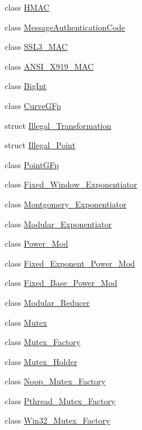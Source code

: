 \begin{DoxyCompactItemize}
class \hyperlink{classBotan_1_1HMAC}{H\-M\-A\-C}
\item 
class \hyperlink{classBotan_1_1MessageAuthenticationCode}{Message\-Authentication\-Code}
\item 
class \hyperlink{classBotan_1_1SSL3__MAC}{S\-S\-L3\-\_\-\-M\-A\-C}
\item 
class \hyperlink{classBotan_1_1ANSI__X919__MAC}{A\-N\-S\-I\-\_\-\-X919\-\_\-\-M\-A\-C}
\item 
class \hyperlink{classBotan_1_1BigInt}{Big\-Int}
\item 
class \hyperlink{classBotan_1_1CurveGFp}{Curve\-G\-Fp}
\item 
struct \hyperlink{structBotan_1_1Illegal__Transformation}{Illegal\-\_\-\-Transformation}
\item 
struct \hyperlink{structBotan_1_1Illegal__Point}{Illegal\-\_\-\-Point}
\item 
class \hyperlink{classBotan_1_1PointGFp}{Point\-G\-Fp}
\item 
class \hyperlink{classBotan_1_1Fixed__Window__Exponentiator}{Fixed\-\_\-\-Window\-\_\-\-Exponentiator}
\item 
class \hyperlink{classBotan_1_1Montgomery__Exponentiator}{Montgomery\-\_\-\-Exponentiator}
\item 
class \hyperlink{classBotan_1_1Modular__Exponentiator}{Modular\-\_\-\-Exponentiator}
\item 
class \hyperlink{classBotan_1_1Power__Mod}{Power\-\_\-\-Mod}
\item 
class \hyperlink{classBotan_1_1Fixed__Exponent__Power__Mod}{Fixed\-\_\-\-Exponent\-\_\-\-Power\-\_\-\-Mod}
\item 
class \hyperlink{classBotan_1_1Fixed__Base__Power__Mod}{Fixed\-\_\-\-Base\-\_\-\-Power\-\_\-\-Mod}
\item 
class \hyperlink{classBotan_1_1Modular__Reducer}{Modular\-\_\-\-Reducer}
\item 
class \hyperlink{classBotan_1_1Mutex}{Mutex}
\item 
class \hyperlink{classBotan_1_1Mutex__Factory}{Mutex\-\_\-\-Factory}
\item 
class \hyperlink{classBotan_1_1Mutex__Holder}{Mutex\-\_\-\-Holder}
\item 
class \hyperlink{classBotan_1_1Noop__Mutex__Factory}{Noop\-\_\-\-Mutex\-\_\-\-Factory}
\item 
class \hyperlink{classBotan_1_1Pthread__Mutex__Factory}{Pthread\-\_\-\-Mutex\-\_\-\-Factory}
\item 
class \hyperlink{classBotan_1_1Win32__Mutex__Factory}{Win32\-\_\-\-Mutex\-\_\-\-Factory}

\end{DoxyCompactItemize}
